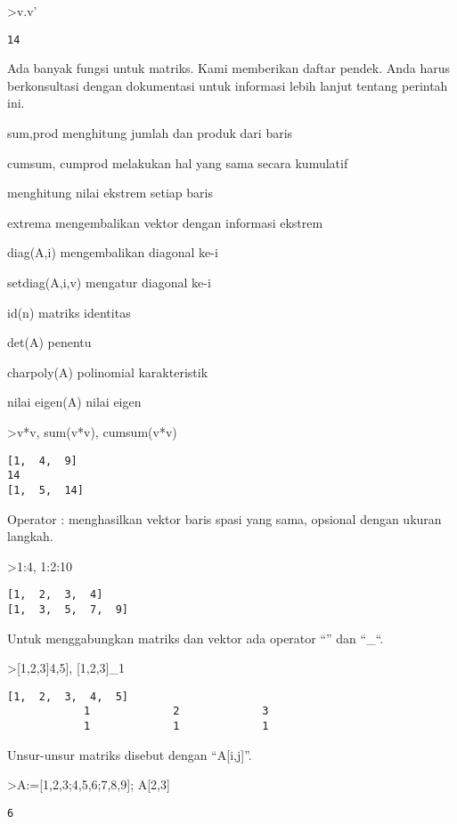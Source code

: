 \documentclass[
]{book}
\begin{document}
\textgreater v.v'

\begin{verbatim}
14
\end{verbatim}

Ada banyak fungsi untuk matriks. Kami memberikan daftar pendek. Anda harus berkonsultasi dengan dokumentasi untuk informasi lebih lanjut tentang perintah ini.

sum,prod menghitung jumlah dan produk dari baris

cumsum, cumprod melakukan hal yang sama secara kumulatif

menghitung nilai ekstrem setiap baris

extrema mengembalikan vektor dengan informasi ekstrem

diag(A,i) mengembalikan diagonal ke-i

setdiag(A,i,v) mengatur diagonal ke-i

id(n) matriks identitas

det(A) penentu

charpoly(A) polinomial karakteristik

nilai eigen(A) nilai eigen

\textgreater v*v, sum(v*v), cumsum(v*v)

\begin{verbatim}
[1,  4,  9]
14
[1,  5,  14]
\end{verbatim}

Operator : menghasilkan vektor baris spasi yang sama, opsional dengan ukuran langkah.

\textgreater1:4, 1:2:10

\begin{verbatim}
[1,  2,  3,  4]
[1,  3,  5,  7,  9]
\end{verbatim}

Untuk menggabungkan matriks dan vektor ada operator ``\textbar{}'' dan ``\_``.

\textgreater{[}1,2,3{]}\textbar{[}4,5{]}, {[}1,2,3{]}\_1

\begin{verbatim}
[1,  2,  3,  4,  5]
            1             2             3 
            1             1             1 
\end{verbatim}

Unsur-unsur matriks disebut dengan ``A{[}i,j{]}''.

\textgreater A:={[}1,2,3;4,5,6;7,8,9{]}; A{[}2,3{]}

\begin{verbatim}
6
\end{verbatim}
\end{document}
